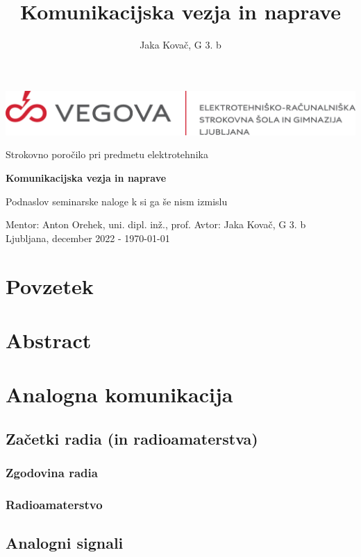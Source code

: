 \documentclass[12pt]{report}
\title{Komunikacijska vezja in naprave}
\author{Jaka Kovač, G 3. b}
\begin{document}

\begin{center}
    \thispagestyle{empty}
    \includegraphics[scale=1]{slike/logotip_vegova_leze_brezokvirja.png}
    
	\vspace{\fill} 
	Strokovno poročilo pri predmetu elektrotehnika

	\Huge{\textbf{Komunikacijska vezja in naprave}}

	\normalsize
	Podnaslov seminarske naloge k si ga še nism izmislu
    \vspace{\fill}

    Mentor: Anton Orehek, uni. dipl. inž., prof.  \hfill Avtor: Jaka Kovač, G 3. b\\
    \null
	Ljubljana, december 2022 - \MMYYYYdate\today
\end{center}
\newpage
\null
\newpage

\section*{Povzetek}
\section*{Abstract}
\newpage

\tableofcontents

\newpage
\section{Analogna komunikacija}
\subsection{Začetki radia (in radioamaterstva)}
\subsubsection{Zgodovina radia}
\subsubsection{Radioamaterstvo}
\subsection{Analogni signali}
\end{document}
